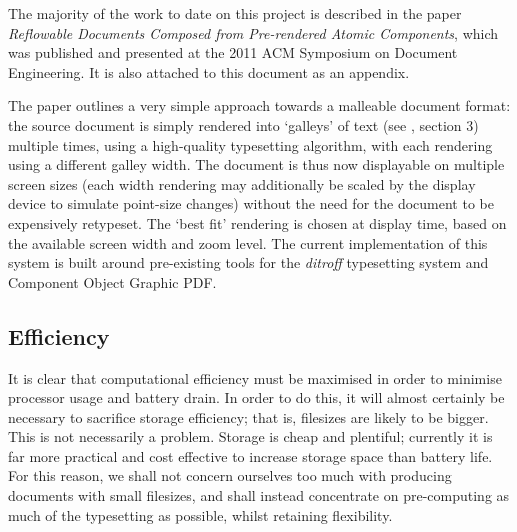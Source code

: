 The majority of the work to date on this project is described in the paper \emph{Reflowable
Documents Composed from Pre-rendered Atomic Components}\cite{Pinkney2011}, which was published and
presented at the 2011 ACM Symposium on Document Engineering. It is also attached to this document as
an appendix.

The paper outlines a very simple approach towards a malleable document format: the source document
is simply rendered into `galleys' of text (see \cite{Pinkney2011}, section 3) multiple times, using
a high-quality typesetting algorithm, with each rendering using a different galley width. The
document is thus now displayable on multiple screen sizes (each width rendering may additionally be
scaled by the display device to simulate point-size changes) without the need for the document to be
expensively retypeset. The `best fit' rendering is chosen at display time, based on the available
screen width and zoom level. The current implementation of this system is built around pre-existing
tools for the \emph{ditroff} typesetting system\cite{Kernighan1982} and Component Object Graphic
PDF\cite{Bagley2003}.

\subsection{Efficiency}
It is clear that computational efficiency must be maximised in order to minimise processor usage and
battery drain. In order to do this, it will almost certainly be necessary to sacrifice storage
efficiency; that is, filesizes are likely to be bigger. This is not necessarily a problem. Storage
is cheap and plentiful; currently it is far more practical and cost effective to increase storage
space than battery life. For this reason, we shall not concern ourselves too much with producing
documents with small filesizes, and shall instead concentrate on pre-computing as much of the
typesetting as possible, whilst retaining flexibility.


